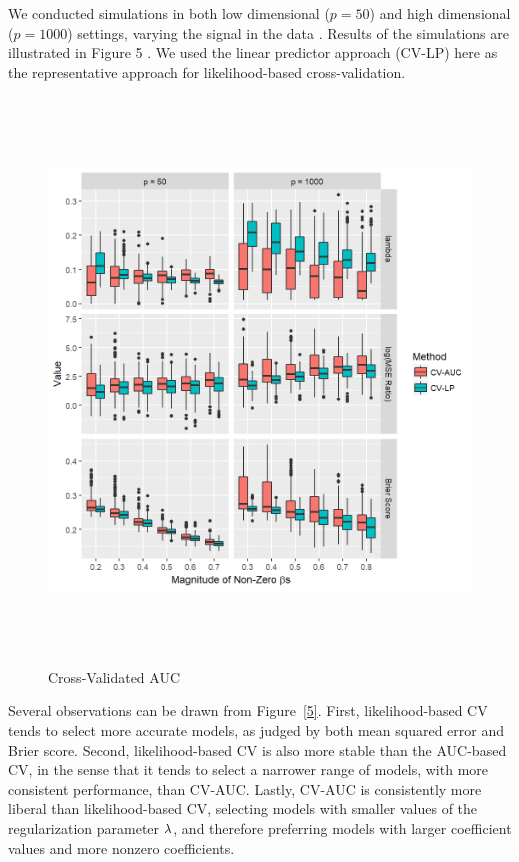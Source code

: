 \par We conducted simulations in both low dimensional ($p = 50$) and high dimensional ($p = 1000$) settings, varying the signal in the data  . Results of the simulations are illustrated in Figure 5 .  We used the linear predictor approach (CV-LP) here as the representative approach for likelihood-based cross-validation.

\begin{figure}[h]
  \centering
  \includegraphics[height= 15cm ]{./figures/figure_auc.png}
  \caption{Cross-Validated AUC }
\end{figure}

Several observations can be drawn from Figure~\ref{5}.  First, likelihood-based CV tends to select more accurate models, as judged by both mean squared error and Brier score.  Second, likelihood-based CV is also more stable than the AUC-based CV, in the sense that it tends to select a narrower range of models, with more consistent performance, than CV-AUC.  Lastly, CV-AUC is consistently more liberal than likelihood-based CV, selecting models with smaller values of the regularization parameter $\lambda$, and therefore preferring models with larger coefficient values and more nonzero coefficients.

